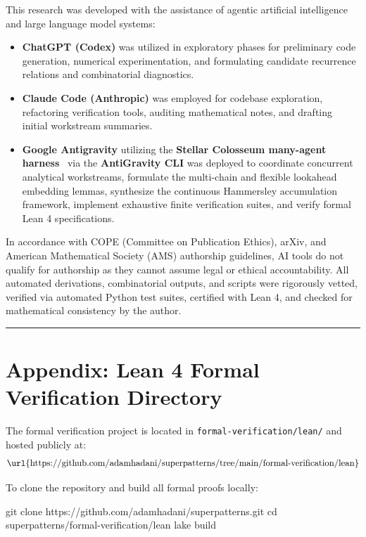 \documentclass[
  11pt,
]{article}
\newenvironment{Shaded}{}{}
\newcommand{\BuiltInTok}[1]{\textcolor[rgb]{0.00,0.50,0.00}{#1}}
\newcommand{\ExtensionTok}[1]{#1}
\newcommand{\FunctionTok}[1]{\textcolor[rgb]{0.02,0.16,0.49}{#1}}
\newcommand{\NormalTok}[1]{#1}
\providecommand{\tightlist}{%
  \setlength{\itemsep}{0pt}\setlength{\parskip}{0pt}}
\begin{document}
This research was developed with the assistance of agentic artificial
intelligence and large language model systems:
\begin{itemize}
\tightlist
\item \textbf{ChatGPT (Codex)} was utilized in exploratory phases for preliminary code
generation, numerical experimentation, and formulating candidate
recurrence relations and combinatorial diagnostics.
\item \textbf{Claude Code (Anthropic)} was employed for codebase exploration, refactoring
verification tools, auditing mathematical notes, and drafting initial
workstream summaries.
\item \textbf{Google Antigravity} utilizing the
\textbf{Stellar Colosseum many-agent harness}~\cite{ref-StellarColosseum26} via the
\textbf{AntiGravity CLI} was deployed to coordinate concurrent
analytical workstreams, formulate the multi-chain and flexible lookahead
embedding lemmas, synthesize the continuous Hammersley accumulation
framework, implement exhaustive finite verification suites, and verify
formal Lean 4 specifications.
\end{itemize}

In accordance with COPE (Committee on Publication Ethics), arXiv, and
American Mathematical Society (AMS) authorship guidelines, AI tools do
not qualify for authorship as they cannot assume legal or ethical
accountability. All automated derivations, combinatorial outputs, and
scripts were rigorously vetted, verified via automated Python test
suites, certified with Lean 4, and checked for mathematical consistency
by the author.

\begin{center}\rule{0.5\linewidth}{0.5pt}\end{center}

\section{Appendix: Lean 4 Formal Verification
Directory}\label{sec:appendix}

The formal verification project is located in
\texttt{formal-verification/lean/} and hosted publicly at:
\[\text{\url{https://github.com/adamhadani/superpatterns/tree/main/formal-verification/lean}}\]

To clone the repository and build all formal proofs locally:

\begin{Shaded}
\begin{Highlighting}[]
\FunctionTok{git}\NormalTok{ clone https://github.com/adamhadani/superpatterns.git}
\BuiltInTok{cd}\NormalTok{ superpatterns/formal{-}verification/lean}
\ExtensionTok{lake}\NormalTok{ build}
\end{Highlighting}
\end{Shaded}
\end{document}

